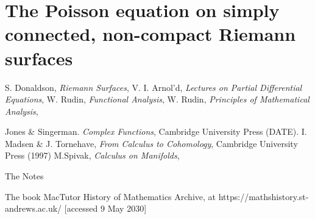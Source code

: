 \documentclass[11pt]{report}
\theoremstyle{definition}
\begin{document}
\section{The Poisson equation on simply connected, non-compact Riemann surfaces}

%
\begin{thebibliography}{99}
 S. Donaldson, {\em Riemann Surfaces},
 V. I. Arnol'd, {\em Lectures on Partial Differential Equations},
 W. Rudin, {\em Functional Analysis},
 W. Rudin, {\em Principles of Mathematical Analysis}, 

 Jones \& Singerman. {\em Complex Functions}, Cambridge University Press (DATE).
 I. Madsen \& J. Tornehave, {\em From Calculus to Cohomology}, Cambridge University Press (1997)
 M.Spivak, {\em Calculus on Manifolds}, 

 The Notes

 The book
%
 MacTutor History of Mathematics Archive, at https://mathshistory.st-andrews.ac.uk/ [accessed 9 May 2030]


\end{thebibliography}
\end{document}
